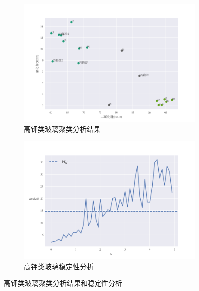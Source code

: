 \documentclass[withoutpreface,bwprint]{cumcmthesis}
\begin{document}
\begin{figure}[H]
	\centering
	\begin{subfigure}[t]{0.47\linewidth}
		\centering
		\includegraphics[width=0.9\linewidth]{高钾类玻璃聚类分析结果.png}
		\caption{高钾类玻璃聚类分析结果}
		\label{fig:高钾类玻璃聚类分析结果}
		\end{subfigure}
		\begin{subfigure}[t]{0.47\linewidth}
		\centering
		\includegraphics[width=0.9\linewidth]{高钾类玻璃稳定性分析.png}
		\caption{高钾类玻璃稳定性分析}
		\label{fig:高钾类玻璃稳定性分析}
		\end{subfigure}
		\caption{高钾类玻璃聚类分析结果和稳定性分析}
\end{figure}
\end{document}

